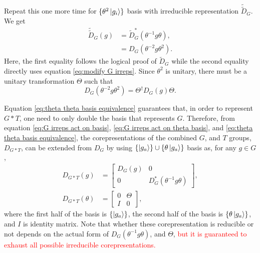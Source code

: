 \documentclass[preprint, 12pt]{revtex4-2}
\numberwithin{equation}{section}
\begin{document}
Repeat this one more time for $\{\theta^2\ket{g_i}\}$ basis with irreducible representation $\tilde{\tilde{D}}_G$. We get
\begin{equation}\label{eq:theta theta basis G irreps}
    \begin{aligned}
        \tilde{\tilde{D}}_G(g) &= \tilde{D}^\ast_G(\theta^{-1}g\theta), \\
        &= D_G(\theta^{-2}g\theta^2).
    \end{aligned}
\end{equation}
Here, the first equality follows the logical proof of $\tilde{D}_G$ while the second equality directly uses equation \ref{eq:modify G irreps}. Since $\theta^2$ is unitary, there must be a unitary transformation $\Theta$ such that
\begin{equation}\label{eq:theta theta basis equivalence}
    D_G(\theta^{-2}g\theta^2) = \Theta^\dagger D_G(g)\Theta.
\end{equation}

Equation \ref{eq:theta theta basis equivalence} guarantees that, in order to represent $G\ast T$, one need to only double the basis that represents $G$. Therefore, from equation \ref{eq:G irreps act on basis}, \ref{eq:G irreps act on theta basis}, and \ref{eq:theta theta basis equivalence}, the corepresentations of the combined $G$, and $T$ groups, $D_{G\ast T}$, can be extended from $D_{G}$ by using $\{\ket{g_a}\}\cup\{\theta\ket{g_a}\}$ basis as, for any $g\in G$,
\begin{equation}\label{eq:G*T Coreps}
    \begin{aligned}
        D_{G\ast T}(g) &=   \begin{bmatrix}
                                D_{G}(g) & 0 \\
                                0 & D_{G}^\ast(\theta^{-1}g\theta)  
                            \end{bmatrix}, \\
        D_{G\ast T}(\theta) &=  \begin{bmatrix}
                                    0 & \Theta \\
                                    I & 0 
                                \end{bmatrix},
    \end{aligned}
\end{equation}
where the first half of the basis is $\{\ket{g_a}\}$, the second half of the basis is $\{\theta\ket{g_a}\}$, and $I$ is identity matrix. Note that whether these corepresentation is reducible or not depends on the actual form of $D_{G}(\theta^{-1}g\theta)$, and $\Theta$, 
\textcolor{red}{but it is guaranteed to exhaust all possible irreducible corepresentations.}
\end{document}
